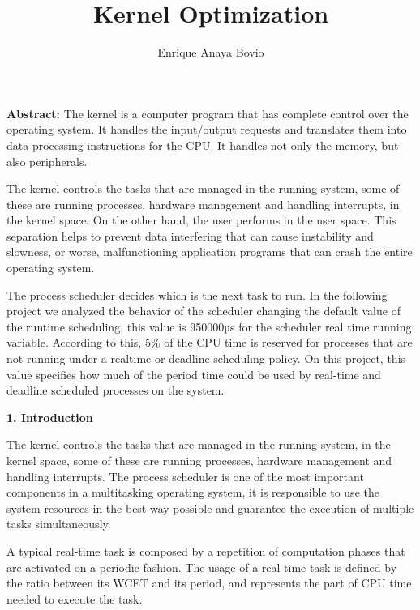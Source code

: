 \documentclass[english]{article}
\begin{document}
\title{\bf Kernel Optimization}

\author{ Enrique Anaya Bovio}

\maketitle
\thispagestyle{fancy}

\vspace{1cm}

{\bf Abstract:} The kernel is a computer program that has complete control over the operating system. It handles the input/output requests and translates them into data-processing instructions for the CPU. It handles not only the memory, but also peripherals. 

The kernel controls the tasks that are managed in the running system, some of these are running processes, hardware management and handling interrupts, in the kernel space. On the other hand, the user performs in the user space. This separation helps to prevent data interfering that can cause instability and slowness, or worse, malfunctioning application programs that can crash the entire operating system. 

The process scheduler decides which is the next task to run. In the following project we analyzed the behavior of the scheduler changing the default value of the runtime scheduling, this value is 950000µs for the scheduler real time running variable. According to this, 5\% of the CPU time is reserved for processes that are not running under a realtime or deadline scheduling policy. On this project, this value specifies how much of the period time could be used by real-time and deadline scheduled processes on the system.


\vspace{1cm}
\begin{center}
{\bf 1. Introduction}
\end{center}

 The kernel controls the tasks that are managed in the running system, in the kernel space, some of these are running processes, hardware management and handling interrupts. The process scheduler is one of the most important components in a multitasking operating system, it is responsible to use the system resources in the best way possible and guarantee the execution of multiple tasks simultaneously.

A typical real-time task is composed by a repetition of computation phases that are activated on a periodic fashion. The usage of a real-time task is defined by the ratio between its WCET and its period, and represents the part of CPU time needed to execute the task.
\end{document}
